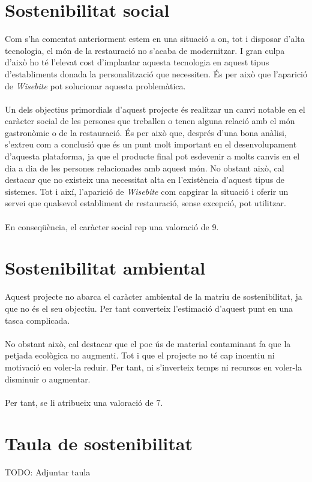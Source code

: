 
\section{Sostenibilitat social}

Com s’ha comentat anteriorment estem en una situació a on, tot i disposar d’alta tecnologia, el món de la restauració no s’acaba de modernitzar. I gran culpa d’això ho té l’elevat cost d’implantar aquesta tecnologia en aquest tipus d’establiments donada la personalització que necessiten. És per això que l’aparició de \textit{Wisebite} pot solucionar aquesta problemàtica.
\\\\
Un dels objectius primordials d’aquest projecte és realitzar un canvi notable en el caràcter social de les persones que treballen o tenen alguna relació amb el món gastronòmic o de la restauració. És per això que, després d’una bona anàlisi, s’extreu com a conclusió que és un punt molt important en el desenvolupament d’aquesta plataforma, ja que el producte final pot esdevenir a molts canvis en el dia a dia de les persones relacionades amb aquest món. No obstant això, cal destacar que no existeix una necessitat alta en l’existència d’aquest tipus de sistemes. Tot i així, l’aparició de \textit{Wisebite} com capgirar la situació i oferir un servei que qualsevol establiment de restauració, sense excepció, pot utilitzar.
\\\\
En conseqüència, el caràcter social rep una valoració de 9.


\section{Sostenibilitat ambiental}

Aquest projecte no abarca el caràcter ambiental de la matriu de sostenibilitat, ja que no és el seu objectiu. Per tant converteix l’estimació d’aquest punt en una tasca complicada.
\\\\
No obstant això, cal destacar que el poc ús de material contaminant fa que la petjada ecològica no augmenti. Tot i que el projecte no té cap incentiu ni motivació en voler-la reduir. Per tant, ni s’inverteix temps ni recursos en voler-la disminuir o augmentar.
\\\\
Per tant, se li atribueix una valoració de 7.


\section{Taula de sostenibilitat}

TODO: Adjuntar taula